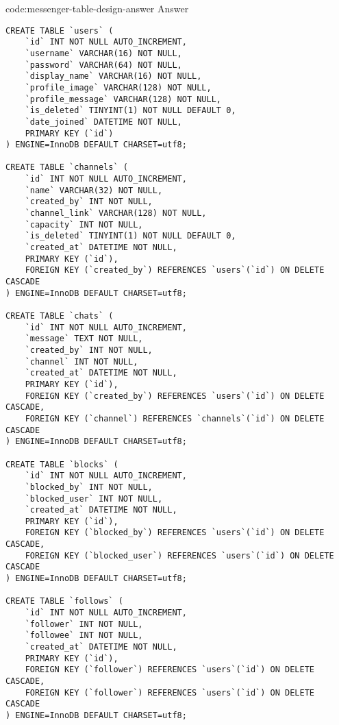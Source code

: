 \begin{codeenv}{code:messenger-table-design-answer}{ Answer}\begin{verbatim}
CREATE TABLE `users` (
    `id` INT NOT NULL AUTO_INCREMENT,
    `username` VARCHAR(16) NOT NULL,
    `password` VARCHAR(64) NOT NULL,
    `display_name` VARCHAR(16) NOT NULL,
    `profile_image` VARCHAR(128) NOT NULL,
    `profile_message` VARCHAR(128) NOT NULL,
    `is_deleted` TINYINT(1) NOT NULL DEFAULT 0,
    `date_joined` DATETIME NOT NULL,
    PRIMARY KEY (`id`)
) ENGINE=InnoDB DEFAULT CHARSET=utf8;

CREATE TABLE `channels` (
    `id` INT NOT NULL AUTO_INCREMENT,
    `name` VARCHAR(32) NOT NULL,
    `created_by` INT NOT NULL,
    `channel_link` VARCHAR(128) NOT NULL,
    `capacity` INT NOT NULL,
    `is_deleted` TINYINT(1) NOT NULL DEFAULT 0,
    `created_at` DATETIME NOT NULL,
    PRIMARY KEY (`id`),
    FOREIGN KEY (`created_by`) REFERENCES `users`(`id`) ON DELETE CASCADE
) ENGINE=InnoDB DEFAULT CHARSET=utf8;

CREATE TABLE `chats` (
    `id` INT NOT NULL AUTO_INCREMENT,
    `message` TEXT NOT NULL,
    `created_by` INT NOT NULL,
    `channel` INT NOT NULL,
    `created_at` DATETIME NOT NULL,
    PRIMARY KEY (`id`),
    FOREIGN KEY (`created_by`) REFERENCES `users`(`id`) ON DELETE CASCADE,
    FOREIGN KEY (`channel`) REFERENCES `channels`(`id`) ON DELETE CASCADE
) ENGINE=InnoDB DEFAULT CHARSET=utf8;

CREATE TABLE `blocks` (
    `id` INT NOT NULL AUTO_INCREMENT,
    `blocked_by` INT NOT NULL,
    `blocked_user` INT NOT NULL,
    `created_at` DATETIME NOT NULL,
    PRIMARY KEY (`id`),
    FOREIGN KEY (`blocked_by`) REFERENCES `users`(`id`) ON DELETE CASCADE,
    FOREIGN KEY (`blocked_user`) REFERENCES `users`(`id`) ON DELETE CASCADE
) ENGINE=InnoDB DEFAULT CHARSET=utf8;

CREATE TABLE `follows` (
    `id` INT NOT NULL AUTO_INCREMENT,
    `follower` INT NOT NULL,
    `followee` INT NOT NULL,
    `created_at` DATETIME NOT NULL,
    PRIMARY KEY (`id`),
    FOREIGN KEY (`follower`) REFERENCES `users`(`id`) ON DELETE CASCADE,
    FOREIGN KEY (`follower`) REFERENCES `users`(`id`) ON DELETE CASCADE
) ENGINE=InnoDB DEFAULT CHARSET=utf8;
\end{verbatim}
\end{codeenv}

